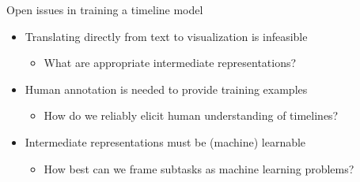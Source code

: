 \documentclass[12pt,compress]{beamer}
\begin{document}
\begin{frame}{Open issues in training a timeline model}
\begin{itemize}[<+->]
\item Translating directly from text to visualization is infeasible
\begin{itemize}
\item What are appropriate intermediate representations?
\end{itemize}
\bigskip
\item Human annotation is needed to provide training examples
\begin{itemize}
\item How do we reliably elicit human understanding of timelines?
\end{itemize}
\bigskip
\item Intermediate representations must be (machine) learnable
\begin{itemize}
\item How best can we frame subtasks as machine learning problems?
\end{itemize}
\end{itemize}
\end{frame}
\end{document}
